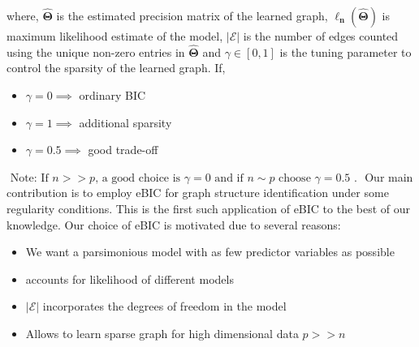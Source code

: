 where, $\mathbf{\hat{\Theta}}$ is the estimated precision matrix of the learned graph, $\mathbf{\ell_{n}(\hat{\Theta})}$ is maximum likelihood estimate of the model, $|\mathcal{E}|$ is the number of edges counted using the unique non-zero entries in $\mathbf{\hat{\Theta}}$ and $\gamma \in[0,1]$ is the tuning parameter to control the sparsity of the learned graph. If,
\begin{itemize}
		\setlength\itemsep{0.6em}
	\item $\gamma=0 \implies$ ordinary BIC
	\item $\gamma=1 \implies$ additional sparsity
	\item $\gamma=0.5 \implies$ good trade-off
\end{itemize}
$\text { Note: If } n>>p \text {, a good choice is } \gamma=0 \text { and if } n \sim p \text { choose } \gamma=0.5 \text { . }$ Our main contribution is to employ eBIC for graph structure identification under some regularity conditions. This is the first such application of eBIC to the best of our knowledge. Our choice of eBIC is motivated due to several reasons:
\begin{itemize}
	\setlength\itemsep{0.5em}
	\item We want a parsimonious model with as few predictor variables as possible
	\item accounts for likelihood of different models
	\item $|\mathcal{E}|$ incorporates the degrees of freedom in the model
	\item Allows to learn sparse graph for high dimensional data $p>>n$
\end{itemize}

